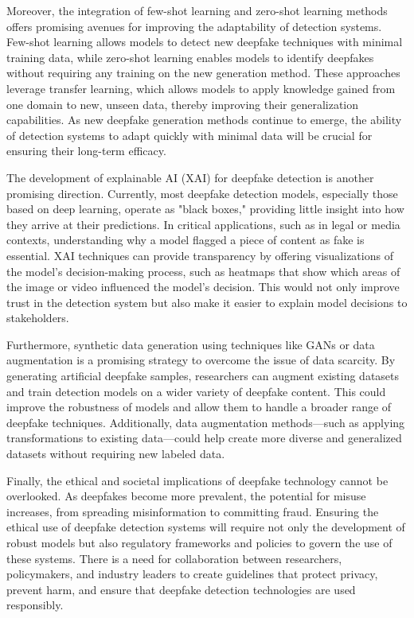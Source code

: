 \documentclass[lettersize,journal]{IEEEtran}
\begin{document}
Moreover, the integration of few-shot learning and zero-shot learning methods offers promising avenues for improving the adaptability of detection systems. Few-shot learning allows models to detect new deepfake techniques with minimal training data, while zero-shot learning enables models to identify deepfakes without requiring any training on the new generation method. These approaches leverage transfer learning, which allows models to apply knowledge gained from one domain to new, unseen data, thereby improving their generalization capabilities. As new deepfake generation methods continue to emerge, the ability of detection systems to adapt quickly with minimal data will be crucial for ensuring their long-term efficacy.

The development of explainable AI (XAI) for deepfake detection is another promising direction. Currently, most deepfake detection models, especially those based on deep learning, operate as "black boxes," providing little insight into how they arrive at their predictions. In critical applications, such as in legal or media contexts, understanding why a model flagged a piece of content as fake is essential. XAI techniques can provide transparency by offering visualizations of the model’s decision-making process, such as heatmaps that show which areas of the image or video influenced the model's decision. This would not only improve trust in the detection system but also make it easier to explain model decisions to stakeholders.\cite{vahdati2024beyond}

Furthermore, synthetic data generation using techniques like GANs or data augmentation is a promising strategy to overcome the issue of data scarcity. By generating artificial deepfake samples, researchers can augment existing datasets and train detection models on a wider variety of deepfake content. This could improve the robustness of models and allow them to handle a broader range of deepfake techniques. Additionally, data augmentation methods—such as applying transformations to existing data—could help create more diverse and generalized datasets without requiring new labeled data.

Finally, the ethical and societal implications of deepfake technology cannot be overlooked. As deepfakes become more prevalent, the potential for misuse increases, from spreading misinformation to committing fraud. Ensuring the ethical use of deepfake detection systems will require not only the development of robust models but also regulatory frameworks and policies to govern the use of these systems. There is a need for collaboration between researchers, policymakers, and industry leaders to create guidelines that protect privacy, prevent harm, and ensure that deepfake detection technologies are used responsibly.
\cite{tian2024detection}
\end{document}
